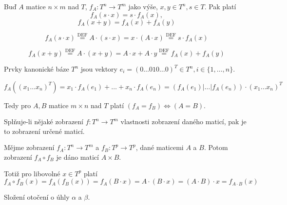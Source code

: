 \documentclass[12pt]{article}					%
\begin{document}
        \begin{tvrzeni}
            Buď $A$ matice $n\times m$ nad $T$, $f_A: T^n \rightarrow T^m$ jako výše, $x, y \in T^n, s\in T$. Pak platí
            $$ f_A(s·x) = s·f_A(x), $$ 
            $$ f_A(x+y) = f_A(x) + f_A(y) $$ 
            \begin{dukazin}
                $$f_A(s·x) \overset{\text{DEF}}{=} A·(s·x) = x·(A·x) \overset{\text{DEF}}{=} s·f_A(x) $$

                $$ f_A(x+y) \overset{\text{DEF}}{=} A·(x+y) = A·x + A·y \overset{\text{DEF}}{=} f_A(x) + f_A(y) $$ 
            \end{dukazin}
        \end{tvrzeni}

        \begin{definice}
            Prvky kanonické báze $T^n$ jsou vektory $e_i = (0 … 0 1 0 … 0)^T \in T^n, i \in \{1, …, n\}$.
        \end{definice}

        \begin{dusledek}
            $$ f_A((x_1 … x_n)^T) = x_1·f_A(e_1) + … + x_n·f_A(e_n) = (f_A(e_1)|…|f_A(e_n))·(x_1 … x_n)^T $$

            Tedy pro $A, B$ matice $m \times n$ nad $T$ platí $(f_A = f_B) \Leftrightarrow (A = B)$.
        \end{dusledek}

        \begin{poznamka}
            Splňuje-li nějaké zobrazení $f: T^n \rightarrow T^m$ vlastnosti zobrazení daného maticí, pak je to zobrazení určené maticí.
        \end{poznamka}

        \begin{tvrzeni}
            Mějme zobrazení $f_A: T^n \rightarrow T^m$ a $f_B: T^p \rightarrow T^p$, dané maticemi $A$ a $B$. Potom zobrazení $f_A \circ f_B$ je dáno maticí $A\times B$.

            \begin{dukazin}
                Totiž pro libovolné $x \in T^p$ platí
                $$ f_A \circ f_B (x) = f_A(f_B(x)) = f_A(B·x) = A·(B·x) = (A·B)·x = f_{A·B}(x) $$ 
            \end{dukazin}
        \end{tvrzeni}

        \begin{priklad}
            Složení otočení o úhly $\alpha$ a $\beta$.
        \end{priklad}
\end{document}
